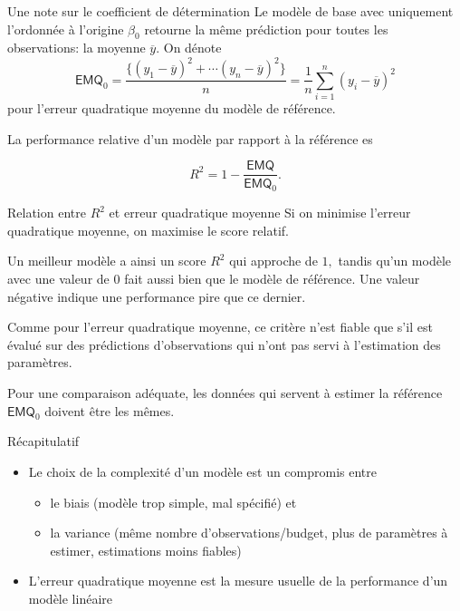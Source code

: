 \documentclass[
  ignorenonframetext,
]{beamer}
\providecommand{\tightlist}{%
  \setlength{\itemsep}{0pt}\setlength{\parskip}{0pt}}\usepackage{longtable,booktabs,array}
\begin{document}
\begin{frame}{Une note sur le coefficient de détermination}
\label{une-note-sur-le-coefficient-de-duxe9termination}
Le modèle de base avec uniquement l'ordonnée à l'origine \(\beta_0\)
retourne la même prédiction pour toutes les observations: la moyenne
\(\overline{y}.\) On dénote
\[\mathsf{EMQ}_0=\frac{\{(y_1-\overline{y})^2 + \cdots (y_n - \overline{y})^2\}}{n} = \frac{1}{n}\sum_{i=1}^n (y_i - \overline{y})^2\]
pour l'erreur quadratique moyenne du modèle de référence.

La performance relative d'un modèle par rapport à la référence es

\[R^2 = 1 - \frac{\mathsf{EMQ}}{\mathsf{EMQ}_0}.\]
\end{frame}

\begin{frame}{Relation entre \(R^2\) et erreur quadratique moyenne}
\label{relation-entre-r2-et-erreur-quadratique-moyenne}
Si on minimise l'erreur quadratique moyenne, on maximise le score
relatif.

Un meilleur modèle a ainsi un score \(R^2\) qui approche de \(1,\)
tandis qu'un modèle avec une valeur de \(0\) fait aussi bien que le
modèle de référence. Une valeur négative indique une performance pire
que ce dernier.

Comme pour l'erreur quadratique moyenne, ce critère n'est fiable que
s'il est évalué sur des prédictions d'observations qui n'ont pas servi à
l'estimation des paramètres.

Pour une comparaison adéquate, les données qui servent à estimer la
référence \(\mathsf{EMQ}_0\) doivent être les mêmes.
\end{frame}

\begin{frame}{Récapitulatif}
\label{ruxe9capitulatif}
\begin{itemize}
\tightlist
\item
  Le choix de la complexité d'un modèle est un compromis entre

  \begin{itemize}
  \tightlist
  \item
    le biais (modèle trop simple, mal spécifié) et
  \item
    la variance (même nombre d'observations/budget, plus de paramètres à
    estimer, estimations moins fiables)
  \end{itemize}
\item
  L'erreur quadratique moyenne est la mesure usuelle de la performance
  d'un modèle linéaire
\end{itemize}
\end{frame}
\end{document}

